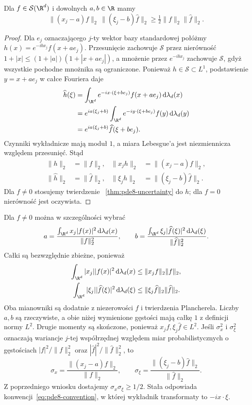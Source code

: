 \begin{wniosek}
Dla $f\in\mathcal S(\R^d)$ i dowolnych $a,b\in\R$
mamy
\[
 \|(x_j-a)f\|_2\,\|(\xi_j-b)\widehat f\|_2
 \ge\tfrac12\|f\|_2\|\widehat f\|_2.
\]
\end{wniosek}
\begin{proof}
Dla $e_j$ oznaczającego $j$-ty wektor
bazy standardowej połóżmy
$h(x)=e^{-ibx_j}f(x+ae_j)$.
Przesunięcie zachowuje $\mathcal S$ przez
nierówność $1+|x|\le(1+|a|)(1+|x+ae_j|)$,
a mnożenie przez $e^{-ibx_j}$ zachowuje
$\mathcal S$, gdyż wszystkie pochodne
mnożnika są ograniczone.
Ponieważ $h\in\mathcal S\subset L^1$,
podstawienie $y=x+ae_j$ w całce Fouriera daje
\[
 \begin{aligned}
 \widehat h(\xi)
 &=\int_{\R^d}e^{-ix\cdot(\xi+be_j)}
 f(x+ae_j)\,\mathrm d\lambda_d(x)\\
 &=e^{ia(\xi_j+b)}
 \int_{\R^d}e^{-iy\cdot(\xi+be_j)}f(y)
 \,\mathrm d\lambda_d(y)\\
 &=e^{ia(\xi_j+b)}\widehat f(\xi+be_j).
 \end{aligned}
\]
Czynniki wykładnicze mają moduł $1$,
a miara Lebesgue'a jest niezmiennicza
względem przesunięć. Stąd
\[
 \begin{aligned}
 \|h\|_2&=\|f\|_2,&
 \|x_jh\|_2&=\|(x_j-a)f\|_2,\\
 \|\widehat h\|_2&=\|\widehat f\|_2,&
 \|\xi_j\widehat h\|_2&=\|(\xi_j-b)\widehat f\|_2.
 \end{aligned}
\]
Dla $f\ne0$ stosujemy twierdzenie
~\ref{thm:pde8-uncertainty} do $h$;
dla $f=0$ nierówność jest oczywista.
\end{proof}

Dla $f\ne0$ można w szczególności wybrać
\[
 a=\frac{\int_{\R^d}x_j|f(x)|^2\,
 \mathrm d\lambda_d(x)}{\|f\|_2^2},
 \qquad
 b=\frac{\int_{\R^d}\xi_j|\widehat f(\xi)|^2\,
 \mathrm d\lambda_d(\xi)}{\|\widehat f\|_2^2}.
\]
Całki są bezwzględnie zbieżne, ponieważ
\[
 \begin{aligned}
 \int_{\R^d}|x_j||f(x)|^2\,\mathrm d\lambda_d(x)
 &\le\|x_jf\|_2\|f\|_2,\\
 \int_{\R^d}|\xi_j||\widehat f(\xi)|^2\,
 \mathrm d\lambda_d(\xi)
 &\le\|\xi_j\widehat f\|_2\|\widehat f\|_2.
 \end{aligned}
\]
Oba mianowniki są dodatnie z niezerowości $f$
i twierdzenia Plancherela. Liczby $a,b$ są
rzeczywiste, a obie niżej wymienione gęstości
mają całkę $1$ z definicji normy $L^2$.
Drugie momenty są skończone, ponieważ
$x_jf,\xi_j\widehat f\in L^2$.
Jeśli $\sigma_x^2$ i $\sigma_\xi^2$
oznaczają wariancje $j$-tej współrzędnej
względem miar probabilistycznych o gęstościach
$|f|^2/\|f\|_2^2$ oraz
$|\widehat f|^2/\|\widehat f\|_2^2$, to
\[
 \sigma_x=\frac{\|(x_j-a)f\|_2}{\|f\|_2},
 \qquad
 \sigma_\xi=\frac{\|(\xi_j-b)\widehat f\|_2}
 {\|\widehat f\|_2}.
\]
Z poprzedniego wniosku dostajemy
$\sigma_x\sigma_\xi\ge1/2$.
Stała odpowiada konwencji~\eqref{eq:pde8-convention},
w której wykładnik transformaty to $-ix\cdot\xi$.

